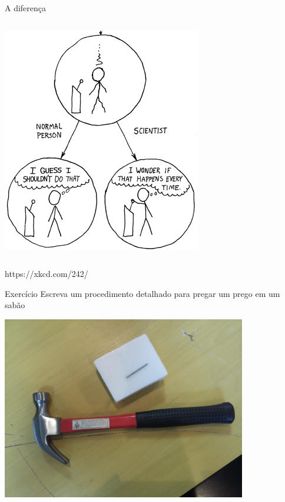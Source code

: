 \documentclass{beamer}
\begin{document}
\begin{frame}{A diferença}
\begin{columns}
\begin{column}{5cm}
\begin{center}
\begin{center}
          \includegraphics[width=\textwidth]{Intro/the_difference2}
        \end{center}
      \end{center}
    \end{column}
  \end{columns}

https://xkcd.com/242/
\end{frame}

\begin{frame}{Exercício}
Escreva um procedimento detalhado para pregar um prego em um sabão

  \begin{center}
    \includegraphics[width=0.8\textwidth]{Intro/pregomartelo}
  \end{center}
\end{frame}
\end{document}
